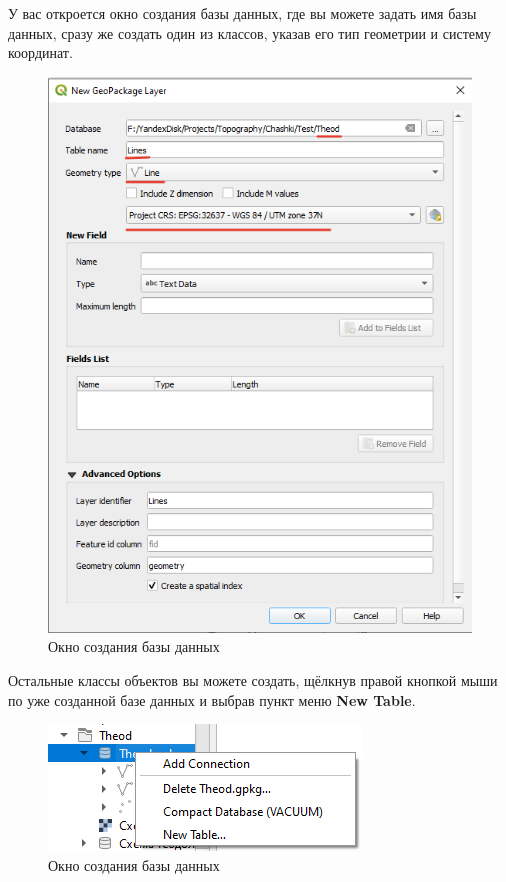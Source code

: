 \documentclass[
  12pt,
]{book}
\begin{document}
У вас откроется окно создания базы данных, где вы можете задать имя базы данных, сразу же создать один из классов, указав его тип геометрии и систему координат.

\begin{figure}
\centering
\includegraphics{images/Practice/DB_creation.png}
\caption{Окно создания базы данных}
\end{figure}

Остальные классы объектов вы можете создать, щёлкнув правой кнопкой мыши по уже созданной базе данных и выбрав пункт меню \textbf{New Table}.

\begin{figure}
\centering
\includegraphics{images/Practice/New_table.png}
\caption{Окно создания базы данных}
\end{figure}
\end{document}
